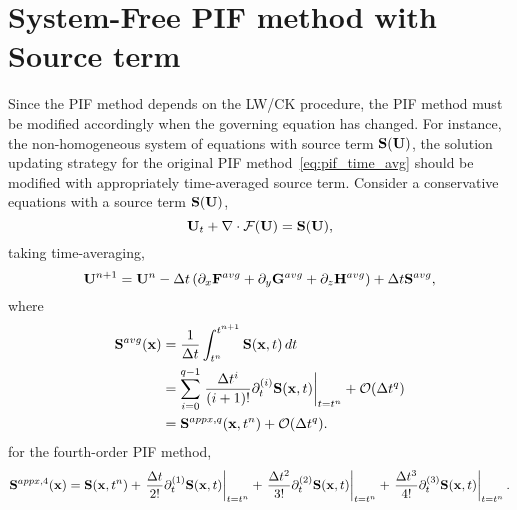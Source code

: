 \section{System-Free PIF method with Source term}\label{sec:sfpif_source}


Since the PIF method depends on the LW/CK procedure,
the PIF method must be modified accordingly when the governing equation has changed.
For instance, the non-homogeneous system of equations with source term \( \mathbf{S}(\mathbf{U}) \),
the solution updating strategy for the original PIF method~\cref{eq:pif_time_avg}
should be modified with appropriately time-averaged source term.
Consider a conservative equations with a source term \( \mathbf{S}(\mathbf{U}) \),
\begin{equation}\label{eq:sf_source_gov}
    \mathbf{U}_{t} + \nabla \cdot \mathcal{F}(\mathbf{U}) = \mathbf{S}(\mathbf{U}),
\end{equation}
taking time-averaging,
\begin{equation}\label{eq:sf_source_time_average}
    \mathbf{U}^{n + 1} = \mathbf{U}^{n} - \Delta t \left( \partial_{x} \mathbf{F}^{avg} + \partial_{y} \mathbf{G}^{avg} + \partial_{z} \mathbf{H}^{avg} \right)
        + \Delta t \mathbf{S}^{avg},
\end{equation}
where
\begin{equation}\label{eq:sf_source_time_taylor}
    \begin{split}
        \mathbf{S}^{avg} (\mathbf{x})
        &= \frac{1}{\Delta t} \int^{t^{n + 1}}_{t^n} \mathbf{S}(\mathbf{x}, t) \mathop{dt}\\
        &= \sum\limits_{i=0}^{q-1}
            \left.\frac{\Delta t^{i}}{(i+1)!} \partial_{t}^{(i)} \mathbf{S} (\mathbf{x}, t) \right|_{t = t^{n}} + \mathcal{O}(\Delta t^{q}) \\
        &= \mathbf{S}^{appx,q} (\mathbf{x}, t^{n}) + \mathcal{O}(\Delta t^{q}).
    \end{split}
\end{equation}
for the fourth-order PIF method,
\begin{equation}\label{eq:sf_source_4order}
    \mathbf{S}^{appx, 4} (\mathbf{x}) = \mathbf{S} (\mathbf{x}, t^{n})
        + \left. \frac{\Delta t}{2!} \partial_{t}^{(1)} \mathbf{S} (\mathbf{x}, t) \right|_{t = t^{n}}
        + \left. \frac{\Delta t^{2}}{3!} \partial_{t}^{(2)} \mathbf{S} (\mathbf{x}, t) \right|_{t = t^{n}}
        + \left. \frac{\Delta t^{3}}{4!} \partial_{t}^{(3)} \mathbf{S} (\mathbf{x}, t) \right|_{t = t^{n}}.
\end{equation}

